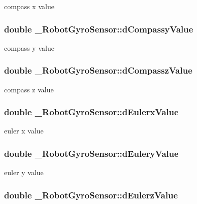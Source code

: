 compass x value \hypertarget{struct__RobotGyroSensor_aead0ecac12a78d2112621fd4c308c031}{
\subsubsection[{d\-Compassy\-Value}]{\setlength{\rightskip}{0pt plus 5cm}double \-\_\-\-Robot\-Gyro\-Sensor\-::d\-Compassy\-Value}}\label{struct__RobotGyroSensor_aead0ecac12a78d2112621fd4c308c031}
compass y value \hypertarget{struct__RobotGyroSensor_a752fbdd33849fcf1d893f53f502d7a0d}{
\subsubsection[{d\-Compassz\-Value}]{\setlength{\rightskip}{0pt plus 5cm}double \-\_\-\-Robot\-Gyro\-Sensor\-::d\-Compassz\-Value}}\label{struct__RobotGyroSensor_a752fbdd33849fcf1d893f53f502d7a0d}
compass z value \hypertarget{struct__RobotGyroSensor_aa5c27e7d7f4938e185b557b547419b51}{
\subsubsection[{d\-Eulerx\-Value}]{\setlength{\rightskip}{0pt plus 5cm}double \-\_\-\-Robot\-Gyro\-Sensor\-::d\-Eulerx\-Value}}\label{struct__RobotGyroSensor_aa5c27e7d7f4938e185b557b547419b51}
euler x value \hypertarget{struct__RobotGyroSensor_a4d3b6fdf22b51d73bf89936aa3e80dc5}{
\subsubsection[{d\-Eulery\-Value}]{\setlength{\rightskip}{0pt plus 5cm}double \-\_\-\-Robot\-Gyro\-Sensor\-::d\-Eulery\-Value}}\label{struct__RobotGyroSensor_a4d3b6fdf22b51d73bf89936aa3e80dc5}
euler y value \hypertarget{struct__RobotGyroSensor_a3bae147fe452610da4be3b125e28ea21}{
\subsubsection[{d\-Eulerz\-Value}]{\setlength{\rightskip}{0pt plus 5cm}double \-\_\-\-Robot\-Gyro\-Sensor\-::d\-Eulerz\-Value}}\label{struct__RobotGyroSensor_a3bae147fe452610da4be3b125e28ea21}
